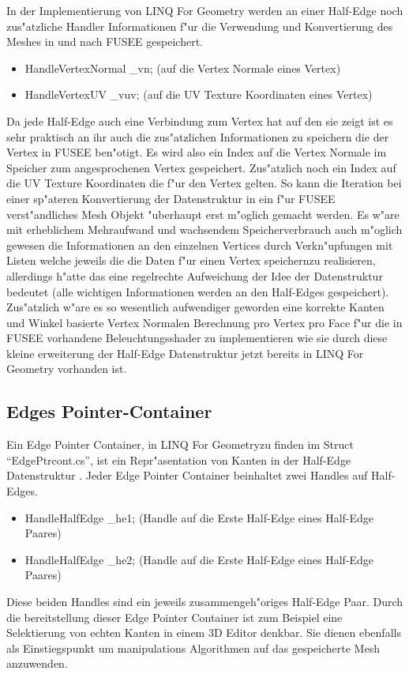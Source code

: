 \documentclass[pagesize, paper=a4, fontsize=12pt,titlepage=true, headings=small, headnosepline, abstractoff, liststotoc, nochapterprefix, plainheadsepline]{scrreprt}
\newcommand{\LFG}{LINQ For Geometry}
\newcommand{\LFGS}{LINQ For Geometry }
\newcommand{\HES}{Half-Edge Datenstruktur }
\begin{document}
In der Implementierung von \LFGS werden an einer Half-Edge noch zus"atzliche Handler Informationen f"ur die Verwendung und Konvertierung des Meshes in und nach FUSEE gespeichert.

\begin{itemize}
\item HandleVertexNormal \_vn; (auf die Vertex Normale eines Vertex)
\item HandleVertexUV \_vuv; (auf die UV Texture Koordinaten eines Vertex)
\end{itemize}

Da jede Half-Edge auch eine Verbindung zum Vertex hat auf den sie zeigt ist es sehr praktisch an ihr auch die zus"atzlichen Informationen zu speichern die der Vertex in FUSEE ben"otigt. Es wird also ein Index auf die Vertex Normale im Speicher zum angesprochenen Vertex gespeichert. Zus"atzlich noch ein Index auf die UV Texture Koordinaten die f"ur den Vertex gelten. So kann die Iteration bei einer sp"ateren Konvertierung der Datenstruktur in ein f"ur FUSEE verst"andliches Mesh Objekt "uberhaupt erst m"oglich gemacht werden. Es w"are mit erheblichem Mehraufwand und wachsendem Speicherverbrauch auch m"oglich gewesen die Informationen an den einzelnen Vertices durch Verkn"upfungen mit Listen welche jeweils die die Daten f"ur einen Vertex speichernzu realisieren, allerdings h"atte das eine regelrechte Aufweichung der Idee der Datenstruktur bedeutet (alle wichtigen Informationen werden an den Half-Edges gespeichert). Zus"atzlich w"are es so wesentlich aufwendiger geworden eine korrekte Kanten und Winkel basierte Vertex Normalen Berechnung pro Vertex pro Face f"ur die in FUSEE vorhandene Beleuchtungsshader zu implementieren wie sie durch diese kleine erweiterung der \HES jetzt bereits in \LFGS vorhanden ist.
		\subsection {Edges Pointer-Container}
			Ein Edge Pointer Container, in \LFG zu finden im Struct "`EdgePtrcont.cs"', ist ein Repr"asentation von Kanten in der \HES. Jeder Edge Pointer Container beinhaltet zwei Handles auf Half-Edges.
\begin{itemize}
\item HandleHalfEdge \_he1; (Handle auf die Erste Half-Edge eines Half-Edge Paares)
\item HandleHalfEdge \_he2; (Handle auf die Erste Half-Edge eines Half-Edge Paares)
\end{itemize}
Diese beiden Handles sind ein jeweils zusammengeh"origes Half-Edge Paar. Durch die bereitstellung dieser Edge Pointer Container ist zum Beispiel eine Selektierung von echten Kanten in einem 3D Editor denkbar. Sie dienen ebenfalls als Einstiegspunkt um manipulations Algorithmen auf das gespeicherte Mesh anzuwenden.
\end{document}
